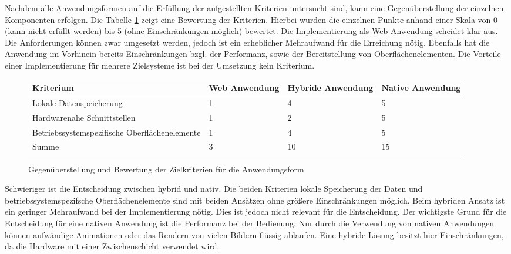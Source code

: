 Nachdem alle Anwendungsformen auf die Erfüllung der aufgestellten Kriterien untersucht sind, kann eine Gegenüberstellung der einzelnen Komponenten erfolgen. Die Tabelle \ref{decision} zeigt eine Bewertung der Kriterien. Hierbei wurden die einzelnen Punkte anhand einer Skala von 0 (kann nicht erfüllt werden) bis 5 (ohne Einschränkungen möglich) bewertet.  Die Implementierung als Web Anwendung scheidet klar aus. Die Anforderungen können zwar umgesetzt werden, jedoch ist ein erheblicher Mehraufwand für die Erreichung nötig. Ebenfalls hat die Anwendung im Vorhinein bereits Einschränkungen bzgl. der Performanz, sowie der Bereitstellung von Oberflächenelementen. Die Vorteile einer Implementierung für mehrere Zielsysteme ist bei der Umsetzung kein Kriterium. \par
\begin{figure}
\begin{tabular}{| p{5.4cm} | p{2.5cm} | p{2.5cm} | p{2.5cm} |}
\toprule[2pt] \rowcolor{dunkelgrau}
\hline
  Kriterium & Web \newline Anwendung & Hybride \newline Anwendung & Native \newline Anwendung \\
  \hline
  Lokale Datenspeicherung & 1 & 4 & 5
   \\
  \hline
  Hardwarenahe Schnittstellen &1  &2  & 5  \\
  \hline
    Betriebssystemspezifische Oberflächenelemente & 1 & 4 & 5 \\
  \hline
    Summe & 3 & 10 & 15 \\
  \hline
\bottomrule[2pt]
\end{tabular}
\caption{Gegenüberstellung und Bewertung der Zielkriterien für die Anwendungsform}
\label{decision}
\end{figure}
\par 
Schwieriger ist die Entscheidung zwischen hybrid und nativ. Die beiden Kriterien lokale Speicherung der Daten und betriebssystemspezifsche Oberflächenelemente sind mit beiden Ansätzen ohne größere Einschränkungen möglich. Beim hybriden Ansatz ist ein geringer Mehraufwand bei der Implementierung nötig. Dies ist jedoch nicht relevant für die Entscheidung. Der wichtigste Grund für die Entscheidung für eine nativen Anwendung ist die Performanz bei der Bedienung. Nur durch die Verwendung von nativen Anwendungen können aufwändige Animationen oder das Rendern von vielen Bildern flüssig ablaufen. Eine hybride Lösung besitzt hier Einschränkungen, da die Hardware mit einer Zwischenschicht verwendet wird.


